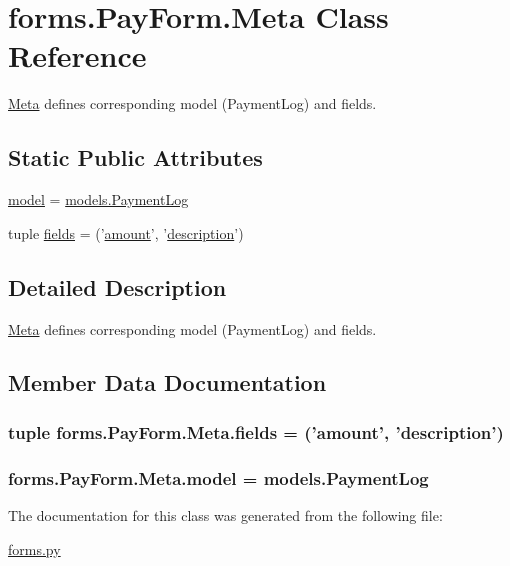 \hypertarget{classforms_1_1_pay_form_1_1_meta}{\section{forms.\-Pay\-Form.\-Meta Class Reference}
\label{classforms_1_1_pay_form_1_1_meta}
}


\hyperlink{classforms_1_1_pay_form_1_1_meta}{Meta} defines corresponding model (Payment\-Log) and fields.  


\subsection*{Static Public Attributes}
\begin{DoxyCompactItemize}
\item 
\hyperlink{classforms_1_1_pay_form_1_1_meta_a0d19bc0415cefc2cb26290e36ecb16e3}{model} = \hyperlink{classmodels_1_1_payment_log}{models.\-Payment\-Log}
\item 
tuple \hyperlink{classforms_1_1_pay_form_1_1_meta_a60fd0e31aecbc3e3265aa1103edac965}{fields} = ('\hyperlink{classforms_1_1_pay_form_a5d1483bf91d02813dc5e452d98beb013}{amount}', '\hyperlink{classforms_1_1_pay_form_a39a3a28d0b444a5e47b103b7fe36c476}{description}')
\end{DoxyCompactItemize}


\subsection{Detailed Description}
\hyperlink{classforms_1_1_pay_form_1_1_meta}{Meta} defines corresponding model (Payment\-Log) and fields. 

\subsection{Member Data Documentation}
\hypertarget{classforms_1_1_pay_form_1_1_meta_a60fd0e31aecbc3e3265aa1103edac965}{
\subsubsection[{fields}]{\setlength{\rightskip}{0pt plus 5cm}tuple forms.\-Pay\-Form.\-Meta.\-fields = ('{\bf amount}', '{\bf description}')\hspace{0.3cm}{\ttfamily [static]}}}\label{classforms_1_1_pay_form_1_1_meta_a60fd0e31aecbc3e3265aa1103edac965}
\hypertarget{classforms_1_1_pay_form_1_1_meta_a0d19bc0415cefc2cb26290e36ecb16e3}{
\subsubsection[{model}]{\setlength{\rightskip}{0pt plus 5cm}forms.\-Pay\-Form.\-Meta.\-model = {\bf models.\-Payment\-Log}\hspace{0.3cm}{\ttfamily [static]}}}\label{classforms_1_1_pay_form_1_1_meta_a0d19bc0415cefc2cb26290e36ecb16e3}


The documentation for this class was generated from the following file\-:\begin{DoxyCompactItemize}
\item 
\hyperlink{forms_8py}{forms.\-py}\end{DoxyCompactItemize}

